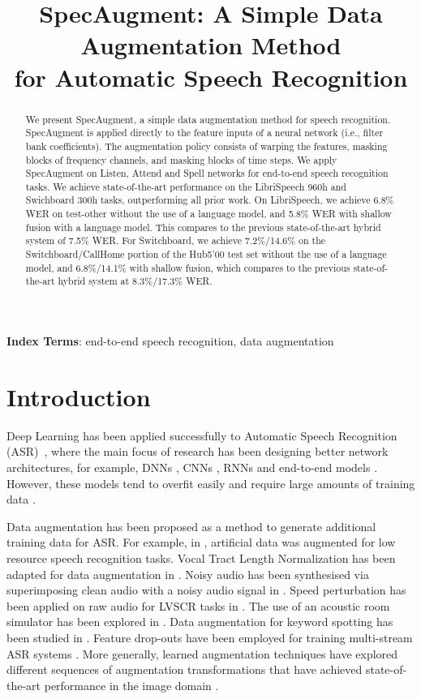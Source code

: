 \documentclass[a4paper]{article}
\title{SpecAugment: A Simple Data Augmentation Method\\
for Automatic Speech Recognition}
\begin{document}
\maketitle
\begin{abstract}
We present SpecAugment, a simple data augmentation method for speech recognition. SpecAugment is applied directly to the feature inputs of a neural network (i.e., filter bank coefficients). The augmentation policy consists of warping the features, masking blocks of frequency channels, and masking blocks of time steps. We apply SpecAugment on Listen, Attend and Spell networks for end-to-end speech recognition tasks. We achieve state-of-the-art performance on the LibriSpeech 960h and Swichboard 300h tasks, outperforming all prior work. On LibriSpeech, we achieve 6.8\% WER on test-other without the use of a language model, and 5.8\% WER with shallow fusion with a language model. This compares to the previous state-of-the-art hybrid system of 7.5\% WER. For Switchboard, we achieve 7.2\%/14.6\% on the Switchboard/CallHome portion of the Hub5'00 test set without the use of a language model, and 6.8\%/14.1\% with shallow fusion, which compares to the previous state-of-the-art hybrid system at 8.3\%/17.3\% WER.
\end{abstract}
\noindent\textbf{Index Terms}: end-to-end speech recognition, data augmentation

\section{Introduction}

Deep Learning has been applied successfully to Automatic Speech Recognition (ASR)~\cite{hinton2012deep}, where the main focus of research has been  designing better  network architectures, for example, DNNs \cite{dahl-ieeetasl-2012}, CNNs \cite{sainath-icassp-2013}, RNNs \cite{graves-icassp-2013} and end-to-end models \cite{graves-icml-2014,Chan2016ListenAA,bahdanau-icassp-2016}. However, these  models tend to overfit easily and require large amounts of training data \cite{chiu-icassp-2018}.

Data augmentation has been proposed as a method to generate additional training data for ASR. For example, in \cite{kanda-asru-2013,ragni-interspeech-2014}, artificial data was augmented for low resource speech recognition tasks. Vocal Tract Length Normalization has been adapted for data augmentation in \cite{jaitly-2013-icml}. Noisy audio has been synthesised via superimposing clean audio with a noisy audio signal in \cite{hannun-arxiv-2014}. Speed perturbation has been applied on raw audio for LVSCR tasks in \cite{ko-interspeech-2015}. The use of an acoustic room simulator has been explored in \cite{kim-interspeech-2017}. Data augmentation for keyword spotting has been studied in \cite{prabhavalkar-2015-icassp, raju-arxiv-2018}. Feature drop-outs have been employed for training multi-stream ASR systems \cite{mallidi-icassp-2016}. More generally, learned augmentation techniques have explored different sequences of augmentation transformations that have achieved state-of-the-art performance in the image domain \cite{Cubuk2018AutoAugmentLA}.
\end{document}
